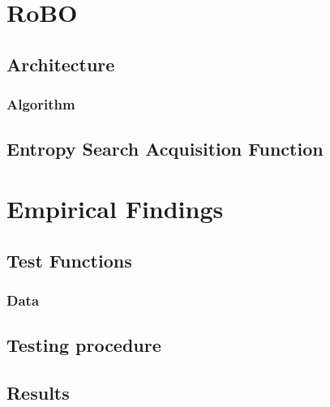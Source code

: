 \documentclass[10pt,handout]{beamer}
\begin{document}
\section{RoBO}

\subsection{Architecture}

\begin{frame}
\frametitle{Algorithm}


\end{frame}

\subsection{Entropy Search Acquisition Function}




\section{Empirical Findings}

\subsection{Test Functions}			


\begin{frame}
\frametitle{Data}


\end{frame}

\subsection{Testing procedure}



\subsection{Results}
\end{document}
